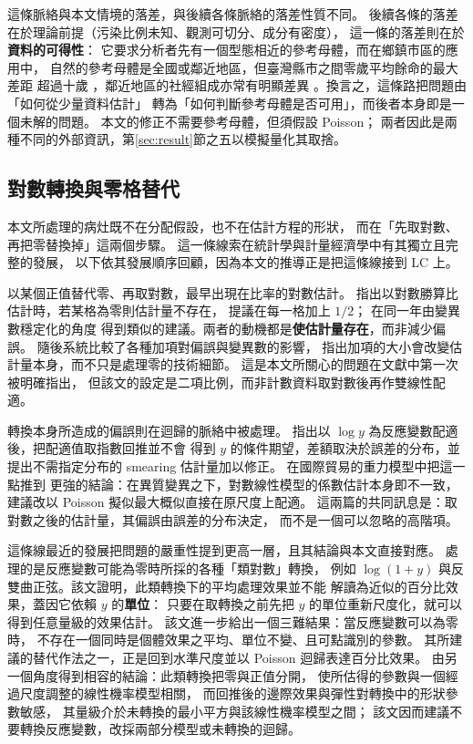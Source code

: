 \documentclass[UTF8, fontset=macnew, a4paper, 12pt]{ctexart}
\begin{document}
這條脈絡與本文情境的落差，與後續各條脈絡的落差性質不同。
後續各條的落差在於理論前提（污染比例未知、觀測可切分、成分有密度），
這一條的落差則在於\textbf{資料的可得性}：
它要求分析者先有一個型態相近的參考母體，而在鄉鎮市區的應用中，
自然的參考母體是全國或鄰近地區，但臺灣縣市之間零歲平均餘命的最大差距
超過十歲 \citep{yue2019}，鄰近地區的社經組成亦常有明顯差異
\citep{wangyue2026}。換言之，這條路把問題由「如何從少量資料估計」
轉為「如何判斷參考母體是否可用」，而後者本身即是一個未解的問題。
本文的修正不需要參考母體，但須假設 Poisson；
兩者因此是兩種不同的外部資訊，第\ref{sec:result}節之五以模擬量化其取捨。

\subsection{對數轉換與零格替代}\label{sec:logzero}

本文所處理的病灶既不在分配假設，也不在估計方程的形狀，
而在「先取對數、再把零替換掉」這兩個步驟。
這一條線索在統計學與計量經濟學中有其獨立且完整的發展，
以下依其發展順序回顧，因為本文的推導正是把這條線接到 LC 上。

以某個正值替代零、再取對數，最早出現在比率的對數估計。
\citet{haldane1956} 指出以對數勝算比估計時，若某格為零則估計量不存在，
提議在每一格加上 $1/2$；\citet{anscombe1956} 在同一年由變異數穩定化的角度
得到類似的建議。兩者的動機都是\textbf{使估計量存在}，而非減少偏誤。
\citet{gart1967} 隨後系統比較了各種加項對偏誤與變異數的影響，
指出加項的大小會改變估計量本身，而不只是處理零的技術細節。
這是本文所關心的問題在文獻中第一次被明確指出，
但該文的設定是二項比例，而非計數資料取對數後再作雙線性配適。

轉換本身所造成的偏誤則在迴歸的脈絡中被處理。
\citet{duan1983} 指出以 $\log y$ 為反應變數配適後，把配適值取指數回推並不會
得到 $y$ 的條件期望，差額取決於誤差的分布，並提出不需指定分布的 smearing
估計量加以修正。\citet{santossilva2006} 在國際貿易的重力模型中把這一點推到
更強的結論：在異質變異之下，對數線性模型的係數估計本身即不一致，
建議改以 Poisson 擬似最大概似直接在原尺度上配適。
這兩篇的共同訊息是：取對數之後的估計量，其偏誤由誤差的分布決定，
而不是一個可以忽略的高階項。

這條線最近的發展把問題的嚴重性提到更高一層，且其結論與本文直接對應。
\citet{chenroth2024} 處理的是反應變數可能為零時所採的各種「類對數」轉換，
例如 $\log(1+y)$ 與反雙曲正弦。該文證明，此類轉換下的平均處理效果並不能
解讀為近似的百分比效果，蓋因它依賴 $y$ 的\textbf{單位}：
只要在取轉換之前先把 $y$ 的單位重新尺度化，就可以得到任意量級的效果估計。
該文進一步給出一個三難結果：當反應變數可以為零時，
不存在一個同時是個體效果之平均、單位不變、且可點識別的參數。
其所建議的替代作法之一，正是回到水準尺度並以 Poisson 迴歸表達百分比效果。
\citet{mullahy2024} 由另一個角度得到相容的結論：此類轉換把零與正值分開，
使所估得的參數與一個經過尺度調整的線性機率模型相關，
而回推後的邊際效果與彈性對轉換中的形狀參數敏感，
其量級介於未轉換的最小平方與該線性機率模型之間；
該文因而建議不要轉換反應變數，改採兩部分模型或未轉換的迴歸。
\end{document}
